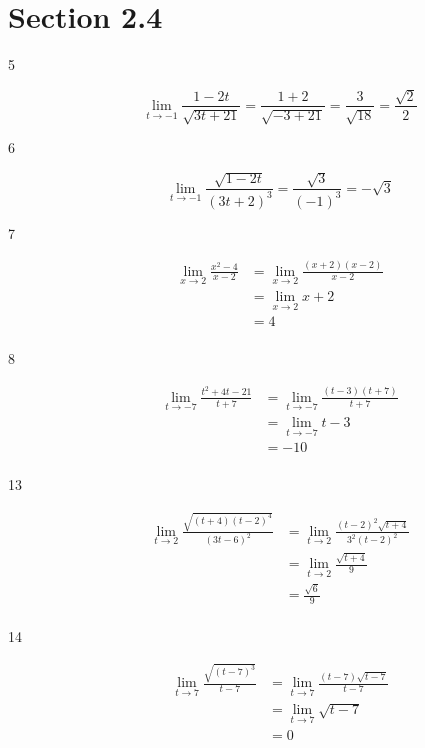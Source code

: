 \documentclass{exam}
\begin{document}
  \section{Section 2.4}
  \begin{description}
    \item[5]
    \[
      \lim_{t \to -1} \frac{1-2t}{\sqrt{3t + 21}} = \frac{1 + 2}{\sqrt{-3 + 21}} = \frac{3}{\sqrt{18}} = \frac{\sqrt{2}}{2}
    \]

    \item[6]
    \[
      \lim_{t \to -1} \frac{\sqrt{1-2t}}{(3t + 2)^3} = \frac{\sqrt{3}}{(-1)^3} = - \sqrt{3}
    \]

    \item[7]
    \begin{align*}
      \lim_{x \to 2} \frac{x^2 - 4}{x-2} &=   \lim_{x \to 2} \frac{(x+2)(x-2)}{x-2} \\
      &= \lim_{x \to 2} x+2 \\
      &= 4 \\
    \end{align*}

    \item[8]
    \begin{align*}
      \lim_{t \to -7} \frac{t^2 + 4t - 21}{t+7} &= \lim_{t \to -7} \frac{(t-3)(t+7)}{t+7} \\
      &= \lim_{t \to -7} t-3 \\
      &= -10 \\
    \end{align*}

    \item[13]
    \begin{align*}
      \lim_{t \to 2} \frac{\sqrt{(t+4)(t-2)^4}}{(3t-6)^2} &= \lim_{t \to 2} \frac{(t-2)^2\sqrt{t+4}}{3^2(t-2)^2} \\
      &= \lim_{t \to 2} \frac{\sqrt{t+4}}{9} \\
      &= \frac{\sqrt{6}}{9} \\
    \end{align*}

    \item[14]
    \begin{align*}
      \lim_{t \to 7} \frac{\sqrt{(t-7)^3}}{t-7} &= \lim_{t \to 7} \frac{(t-7)\sqrt{t-7}}{t-7} \\
      &= \lim_{t \to 7} \sqrt{t-7} \\
      &= 0 \\
    \end{align*}


\end{description}
\end{document}
